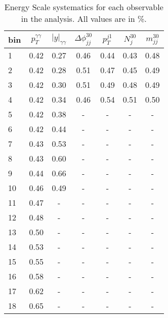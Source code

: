 \documentclass[a4paper,11pt]{article}
\begin{document}
\begin{table}[h]
\centering
\small
\caption{Energy Scale systematics for each observable in the analysis. All values are in \%.}
\vspace{0.4cm}
\begin{tabular}{l | cccccc}
bin & $p_T^{\gamma\gamma}$ & $|y|_{\gamma\gamma}$ & $\Delta\phi_{jj}^{30}$ & $p_T^{j1}$ & $N_j^{30}$ & $m_{jj}^{30}$ \\
\hline
1 & 0.42 & 0.27 & 0.46 & 0.44 & 0.43 & 0.48 \\
2 & 0.42 & 0.28 & 0.51 & 0.47 & 0.45 & 0.49 \\
3 & 0.42 & 0.30 & 0.51 & 0.49 & 0.48 & 0.49 \\
4 & 0.42 & 0.34 & 0.46 & 0.54 & 0.51 & 0.50 \\
5 & 0.42 & 0.38 & - & - & - & - \\
6 & 0.42 & 0.44 & - & - & - & - \\
7 & 0.43 & 0.53 & - & - & - & - \\
8 & 0.43 & 0.60 & - & - & - & - \\
9 & 0.44 & 0.66 & - & - & - & - \\
10 & 0.46 & 0.49 & - & - & - & - \\
11 & 0.47 & - & - & - & - & - \\
12 & 0.48 & - & - & - & - & - \\
13 & 0.50 & - & - & - & - & - \\
14 & 0.53 & - & - & - & - & - \\
15 & 0.55 & - & - & - & - & - \\
16 & 0.58 & - & - & - & - & - \\
17 & 0.62 & - & - & - & - & - \\
18 & 0.65 & - & - & - & - & - \\
\end{tabular}
\end{table}
\end{document}
